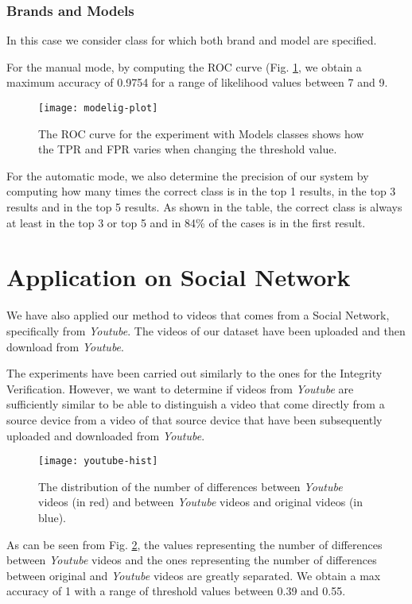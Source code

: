 \subsubsection*{Brands and Models}

In this case we consider class for which both brand and model are specified. 

For the manual mode, by computing the ROC curve (Fig. \ref{fig:model-roc}, we obtain a maximum accuracy of 0.9754 for a range of likelihood values between 7 and 9.

\begin{figure}
  \centering
  \texttt{[image: modelig-plot]}
  \caption{The ROC curve for the experiment with Models classes shows how the TPR and FPR varies when changing the threshold value.}\label{fig:model-roc}
\end{figure}

For the automatic mode, we also determine the precision of our system by computing how many times the correct class is in the top 1 results, in the top 3 results and in the top 5 results. As shown in the table, the correct class is always at least in the top 3 or top 5 and in 84\% of the cases is in the first result.

\section{Application on Social Network}

We have also applied our method to videos that comes from a Social Network, specifically from \emph{Youtube}. The videos of our dataset have been uploaded and then download from \emph{Youtube}.

The experiments have been carried out similarly to the ones for the Integrity Verification. However, we want to determine if videos from \emph{Youtube} are sufficiently similar to be able to distinguish a video that come directly from a source device from a video of that source device that have been subsequently uploaded and downloaded from \emph{Youtube}.

\begin{figure}
  \centering
  \texttt{[image: youtube-hist]}
  \caption{The distribution of the number of differences between \emph{Youtube} videos (in red) and between \emph{Youtube} videos and original videos (in blue).}\label{fig:youtube-hist}
\end{figure}

As can be seen from Fig. \ref{fig:youtube-hist}, the values representing the number of differences between \emph{Youtube} videos and the ones representing the number of differences between original and \emph{Youtube} videos are greatly separated. We obtain a max accuracy of 1 with a range of threshold values between 0.39 and 0.55.